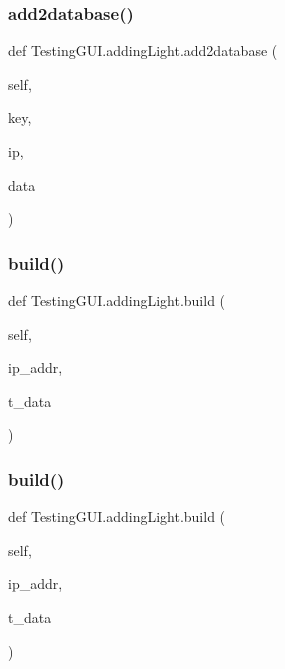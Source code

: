 \subsubsection{\texorpdfstring{add2database()}{add2database()}\hspace{0.1cm}{\footnotesize\ttfamily [2/2]}}
{\footnotesize\ttfamily def Testing\+G\+U\+I.\+adding\+Light.\+add2database (\begin{DoxyParamCaption}\item[{}]{self,  }\item[{}]{key,  }\item[{}]{ip,  }\item[{}]{data }\end{DoxyParamCaption})}

\mbox{\label{classTestingGUI_1_1addingLight_a09539dcb1cdfd504a9e75937bf380284}} 
\subsubsection{\texorpdfstring{build()}{build()}\hspace{0.1cm}{\footnotesize\ttfamily [1/2]}}
{\footnotesize\ttfamily def Testing\+G\+U\+I.\+adding\+Light.\+build (\begin{DoxyParamCaption}\item[{}]{self,  }\item[{}]{ip\+\_\+addr,  }\item[{}]{t\+\_\+data }\end{DoxyParamCaption})}

\mbox{\label{classTestingGUI_1_1addingLight_a09539dcb1cdfd504a9e75937bf380284}} 
\subsubsection{\texorpdfstring{build()}{build()}\hspace{0.1cm}{\footnotesize\ttfamily [2/2]}}
{\footnotesize\ttfamily def Testing\+G\+U\+I.\+adding\+Light.\+build (\begin{DoxyParamCaption}\item[{}]{self,  }\item[{}]{ip\+\_\+addr,  }\item[{}]{t\+\_\+data }\end{DoxyParamCaption})}

